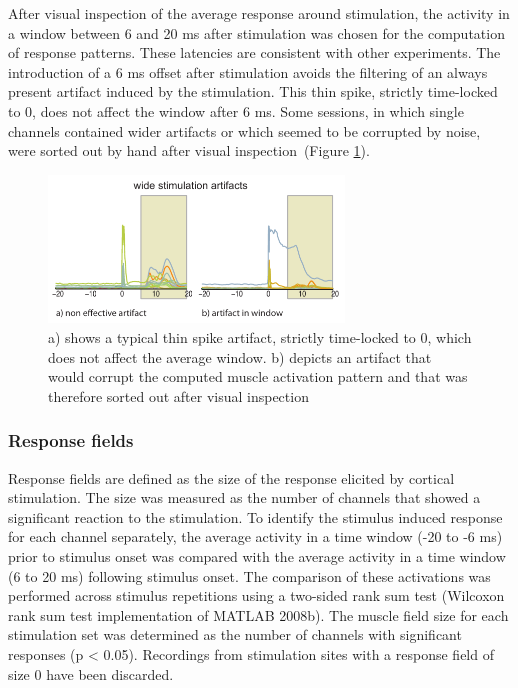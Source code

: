 \documentclass[a4paper]{article}
\newcommand{\rref}[1]{(Figure \ref{#1})}%
\begin{document}
After visual inspection of the average response around stimulation, the activity in a window between 6 and 20 ms after stimulation was chosen for the computation of response patterns. These latencies are consistent with other experiments\cite{Park:2004p3042}. The introduction of a 6 ms offset after stimulation avoids the filtering of an always present artifact induced by the stimulation. This thin spike, strictly time-locked to 0, does not affect the window after 6 ms. Some sessions, in which single channels contained wider artifacts or which seemed to be corrupted by noise, were sorted out by hand after visual inspection~\rref{sg:fig:images_artifacts}.
\begin{figure}[ht]
	\centering
		\includegraphics[width=0.7\textwidth]{images/artifacts.pdf}
	\caption{a) shows a typical thin spike artifact, strictly time-locked to 0, which does not affect the average window.
	b) depicts an artifact that would corrupt the computed muscle activation pattern and that was therefore sorted out
	after visual inspection}
	\label{sg:fig:images_artifacts}
\end{figure}




\subsubsection{Response fields} %
\label{sg:subs:response_fields}

Response fields are defined as the size of the response elicited by cortical stimulation. The size was measured as the number of channels that showed a significant reaction to the stimulation. To identify the stimulus induced response for each channel separately, the average activity in a time window (-20 to -6 ms) prior to stimulus onset was compared with the average activity in a time window (6 to 20 ms) following stimulus onset. The comparison of these activations was performed across stimulus repetitions using a two-sided rank sum test (Wilcoxon rank sum test implementation of MATLAB 2008b). The muscle field size for each stimulation set was determined as the number of channels with significant responses (p < 0.05). Recordings from stimulation sites with a response field of size 0 have been discarded.
\end{document}
